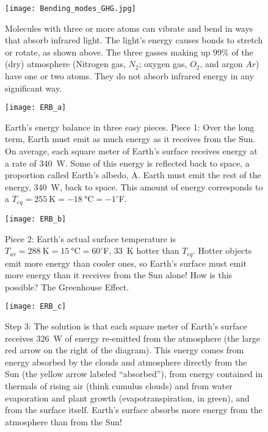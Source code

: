 \documentclass[amstex,12pt]{book}
\begin{document}
\begin{figure}[p]
\centering
\texttt{[image: Bending\_modes\_GHG.jpg]}%
\caption{Molecules with three or more atoms can vibrate and bend in ways that absorb infrared light. The light's energy causes bonds to stretch or rotate, as shown above. The three gasses making up 99\% of the (dry) atmosphere (Nitrogen gas, $N_2$; oxygen gas, $O_2$, and argon $Ar$) have one or two atoms. They do not absorb infrared energy in any significant way.}   
\label{fig:bending_modes}
\end{figure}

\begin{figure}[p]
\centering
\texttt{[image: ERB\_a]}%
\caption{Earth's energy balance in three easy pieces. Piece 1: Over the long term, Earth must emit as much energy as it receives from the Sun. On average, each square meter of Earth's surface receives energy at a rate of \SI{340}{\watt}. Some of this energy is reflected back to space, a proportion called Earth's albedo, A. Earth must emit the rest of the energy, \SI{340}{\watt}, back to space. This amount of energy corresponds to a $T_{eq} = \SI{255}{\kelvin}=\SI{-18}{\celsius}=-1^{\circ}$F.}   
\label{fig:erb_a}
\end{figure}

\begin{figure}[p]
\centering
\texttt{[image: ERB\_b]}%
\caption{Piece 2: Earth's actual surface temperature is $T_{av} = \SI{288}{\kelvin}=\SI{15}{\celsius}=60^{\circ}$F, \SI{33}{\kelvin} hotter than $T_{eq}$. Hotter objects emit more energy than cooler ones, so Earth's surface must emit more energy than it receives from the Sun alone! How is this possible? The Greenhouse Effect.}   
\label{fig:erb_b}
\end{figure}

\begin{figure}[p]
\centering
\texttt{[image: ERB\_c]}%
\caption{Step 3: The solution is that each square meter of Earth's surface receives \SI{326}{\watt} of energy re-emitted from the atmosphere (the large red arrow on the right of the diagram). This energy comes from energy absorbed by the clouds and atmosphere directly from the Sun (the yellow arrow labeled ``absorbed''), from energy contained in thermals of rising air (think cumulus clouds) and from water evaporation and plant growth (evapotranspiration, in green), and from the surface itself. Earth’s surface absorbs more energy from the atmosphere than from the Sun!}   
\label{fig:erb_c}
\end{figure}
\end{document}
